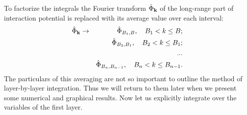 To factorize the integrals the Fourier transform $\hat{\Phi}_{\vb k}$ of the long-range part of interaction potential is replaced with its average value over each interval:
\begin{eqnarray*}
	\hat{\Phi}_{\vb k} & \rightarrow & \hat{\Phi}_{B_1, B}, \quad B_1 < k \leq B;
	\\
	& & \hat{\Phi}_{B_2, B_1}, \quad B_2 < k \leq B_1;
	\\
	& & ...
	\\
	& & \hat{\Phi}_{B_n, B_{n-1}}, \quad B_n < k \leq B_{n-1}.
\end{eqnarray*}
The particulars of this averaging are not so important to outline the method of layer-by-layer integration. Thus we will return to them later when we present some numerical and graphical results.
Now let us explicitly integrate over the variables of the first layer.

